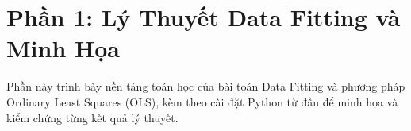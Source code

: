﻿\section{Phần 1: Lý Thuyết Data Fitting và Minh Họa}

Phần này trình bày nền tảng toán học của bài toán Data Fitting và phương pháp
Ordinary Least Squares (OLS), kèm theo cài đặt Python từ đầu để minh họa và
kiểm chứng từng kết quả lý thuyết.


